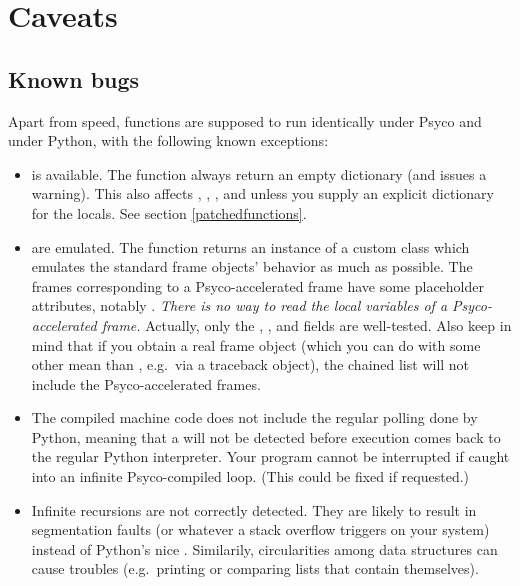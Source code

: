 \documentclass{manual}
\begin{document}
\appendix
\chapter{Caveats}


\section{Known bugs}\label{bugs}

Apart from speed, functions are supposed to run identically under Psyco and under Python, with the following known exceptions:
%
%
\begin{itemize}

\item {} is available.  The  function always return an empty dictionary (and issues a warning).  This also affects , , ,  and  unless you supply an explicit dictionary for the locals.  See section \ref{patchedfunctions}.
  
\item {} are emulated.  The  function returns an instance of a custom class which emulates the standard frame objects' behavior as much as possible.  The frames corresponding to a Psyco-accelerated frame have some placeholder attributes, notably .  \emph{There is no way to read the local variables of a Psyco-accelerated frame.}  Actually, only the , ,  and  fields are well-tested.  Also keep in mind that if you obtain a real frame object (which you can do with some other mean than , e.g.\ via a traceback object), the  chained list will not include the Psyco-accelerated frames.

\item The compiled machine code does not include the regular polling done by Python, meaning that a  will not be detected before execution comes back to the regular Python interpreter.  Your program cannot be interrupted if caught into an infinite Psyco-compiled loop.  (This could be fixed if requested.)

\item Infinite recursions are not correctly detected. They are likely to result in segmentation faults (or whatever a stack overflow triggers on your system) instead of Python's nice . Similarily, circularities among data structures can cause troubles (e.g.\ printing or comparing lists that contain themselves).

\end{itemize}
\end{document}
